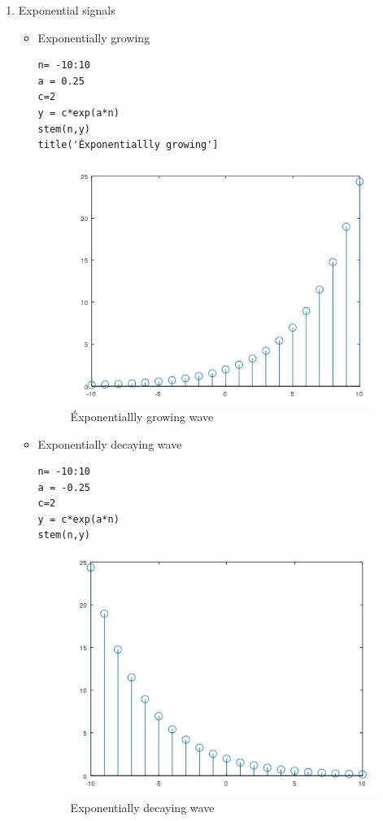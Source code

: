 \documentclass[12pt]{article}
\begin{document}
\begin{enumerate}
    \item Exponential signals
    \begin{itemize}
        
        \item Exponentially growing \:
        \begin{Verbatim}[frame = single]
n= -10:10
a = 0.25
c=2
y = c*exp(a*n)
stem(n,y)
title('Éxponentiallly growing']
        \end{Verbatim}
        \begin{figure}[h!]
            \centering
            \includegraphics[scale =0.5]{labss/Lab2_3a.PNG}
            \caption{Éxponentiallly growing wave}
        \end{figure}
        
        \item Exponentially decaying wave \:
        \begin{Verbatim}[frame = single]
n= -10:10
a = -0.25
c=2
y = c*exp(a*n)
stem(n,y)
        \end{Verbatim}
        \begin{figure}[h!]
            \centering
            \includegraphics[scale =0.55]{labss/Lab2_3b.PNG}
            \caption{Exponentially decaying wave}
        \end{figure}
        

\end{itemize}
\end{enumerate}
\end{document}
